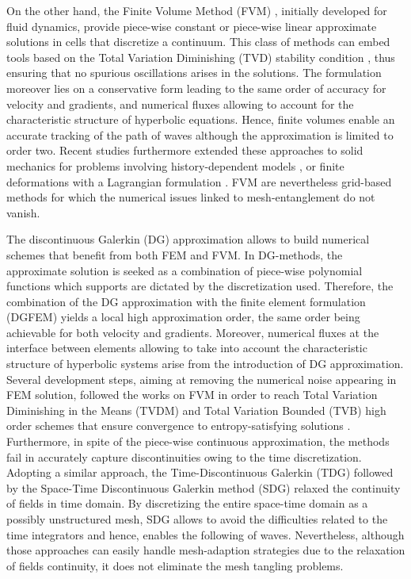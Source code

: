 On the other hand, the Finite Volume Method (FVM) \cite{Leveque}, initially developed for fluid dynamics, provide piece-wise constant or piece-wise linear approximate solutions in cells that discretize a continuum. 
This class of methods can embed tools based on the Total Variation Diminishing (TVD) stability condition \cite{Harten}, thus ensuring that no spurious oscillations arises in the solutions. 
The formulation moreover lies on a conservative form leading to the same order of accuracy for velocity and gradients, and numerical fluxes allowing to account for the characteristic structure of hyperbolic equations.
Hence, finite volumes enable an accurate tracking of the path of waves although the approximation is limited to order two.
Recent studies furthermore extended these approaches to solid mechanics for problems involving history-dependent models \cite{Gavrilyuk,Thomas_EP}, or finite deformations with a Lagrangian formulation \cite{Lee_FVM,Haider_FVM}.
FVM are nevertheless grid-based methods for which the numerical issues linked to mesh-entanglement do not vanish. %

The discontinuous Galerkin (DG) approximation \cite{NeutronDG} allows to build numerical schemes that benefit from both FEM and FVM.
In DG-methods, the approximate solution is seeked as a combination of piece-wise polynomial functions which supports are dictated by the discretization used.
Therefore, the combination of the DG approximation with the finite element formulation (DGFEM) yields a local high approximation order, the same order being achievable for both velocity and gradients.
Moreover, numerical fluxes at the interface between elements allowing to take into account the characteristic structure of hyperbolic systems arise from the introduction of DG approximation.
Several development steps, aiming at removing the numerical noise appearing in FEM solution, followed the works on FVM in order to reach Total Variation Diminishing in the Means (TVDM) and Total Variation Bounded (TVB) high order schemes that ensure convergence to entropy-satisfying solutions \cite{Cockburn}.
Furthermore, in spite of the piece-wise continuous approximation, the methods fail in accurately capture discontinuities owing to the time discretization.
Adopting a similar approach, the Time-Discontinuous Galerkin (TDG) \cite{Hughes_TDG} followed by the Space-Time Discontinuous Galerkin method (SDG) \cite{ST_DGFEM1} relaxed the continuity of fields in time domain. 
By discretizing the entire space-time domain as a possibly unstructured mesh, SDG allows to avoid the difficulties related to the time integrators and hence, enables the following of waves.
Nevertheless, although those approaches can easily handle mesh-adaption strategies due to the relaxation of fields continuity, it does not eliminate the mesh tangling problems.

